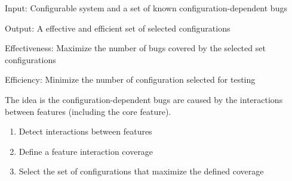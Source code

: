Input: Configurable system and a set of known configuration-dependent bugs

Output: A effective and efficient set of selected configurations

Effectiveness: Maximize the number of bugs covered by the selected set configurations

Efficiency: Minimize the number of configuration selected for testing

The idea is the configuration-dependent bugs are caused by the interactions between features (including the core feature). 
\begin{enumerate}
	\item Detect interactions between features

	\item Define a feature interaction coverage

	\item Select the set of configurations that maximize the defined coverage
\end{enumerate}